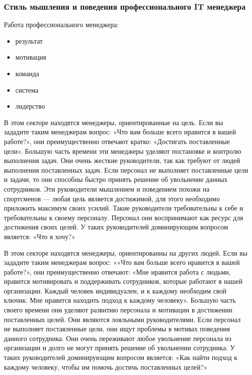 \documentclass{../industrial-development}
\begin{document}
\begin{frame} \frametitle{Стиль мышления и поведения профессионального IT менеджера
}
\begin{block}{Работа профессионального менеджера:}
	\begin{itemize}
		\item результат
		\item мотивация
		\item команда
		\item система
		\item лидерство
	\end{itemize}
\end{block}
\end{frame}
\lecturenotes
В этом секторе находятся менеджеры, ориентированные на цель. Если вы зададите таким менеджерам вопрос: «Что вам больше всего нравится в вашей работе?», они преимущественно отвечают кратко: «Достигать поставленные цели». Большую часть времени эти менеджеры уделяют постановке и контролю выполнения задач. Они очень жесткие руководители, так как требуют от людей выполнения поставленных задач. Если персонал не выполняет поставленные цели и задачи, то они способны быстро принять решение об увольнение данных сотрудников.
Эти руководители мышлением и поведением похожи на спортсменов — любая цель является достижимой, для этого необходимо приложить максимум своих усилий. Такие руководители требовательны к себе и требовательны к своему персоналу. Персонал они воспринимают как ресурс для достижения своих целей. У таких руководителей доминирующим вопросом является: «Что я хочу?»

В этом секторе находятся менеджеры, ориентированны на других людей. Если вы зададите таким менеджерам вопрос: ««Что вам больше всего нравится в вашей работе?», они преимущественно отвечают: «Мне нравится работа с людьми, нравится мотивировать и поддерживать сотрудников, которые работают в нашей организации. Каждый человек индивидуален, и к каждому необходим свой ключик. Мне нравится находить подход к каждому человеку».
Большую часть своего времени они уделяют развитию персонала и мотивации в достижении поставленных целей. Они являются лояльными руководителями. Если персонал не выполняет поставленные цели, они ищут проблемы в мотивах поведения данного сотрудника. Они очень переживают любое увольнение персонала из организации и долго не могут принять решение об увольнении сотрудника. У таких руководителей доминирующим вопросом является: «Как найти подход к каждому человеку, чтобы им помочь достичь поставленных целей?»
\end{document}
